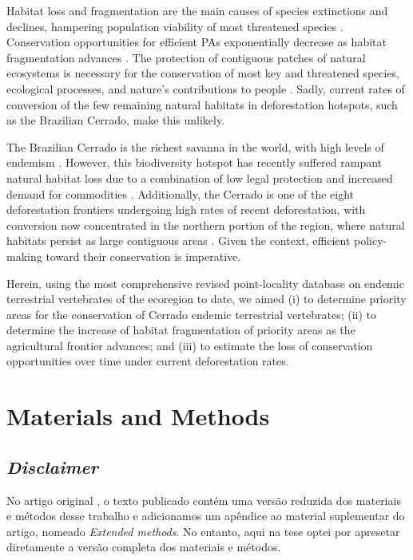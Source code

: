 \documentclass[12pt,openright,oneside,a4paper,english]{abntex2}
\begin{document}
Habitat loss and fragmentation are the main causes of species extinctions and declines, hampering population viability of most threatened species \citep{IPBES2019, Grande2020}. Conservation opportunities for efficient PAs exponentially decrease as habitat fragmentation advances \citep{Nori2013}. The protection of contiguous patches of natural ecosystems is necessary for the conservation of most key and threatened species, ecological processes, and nature’s contributions to people \citep{Diaz2018}. Sadly, current rates of conversion of the few remaining natural habitats in deforestation hotspots, such as the Brazilian Cerrado, make this unlikely.

The Brazilian Cerrado is the richest savanna in the world, with high levels of endemism \citep{Strassburg2017}. However, this biodiversity hotspot has recently suffered rampant natural habitat loss due to a combination of low legal protection and increased demand for commodities \citep{Pacheco2021}. Additionally, the Cerrado is one of the eight deforestation frontiers undergoing high rates of recent deforestation, with conversion now concentrated in the northern portion of the region, where natural habitats persist as large contiguous areas \citep{Strassburg2017}. Given the context, efficient policy-making toward their conservation is imperative.

Herein, using the most comprehensive revised point-locality database on endemic terrestrial vertebrates of the ecoregion to date, we aimed (i) to determine priority areas for the conservation of Cerrado endemic terrestrial vertebrates; (ii) to determine the increase of habitat fragmentation of priority areas as the agricultural frontier advances; and (iii) to estimate the loss of conservation opportunities over time under current deforestation rates.

\section{Materials and Methods}
\subsection*{\textit{Disclaimer}}

No artigo original \citep{VieiraAlencar2023}, o texto publicado contém uma versão reduzida dos materiais e métodos desse trabalho e adicionamos um apêndice ao material suplementar do artigo, nomeado \textit{Extended methods}. No entanto, aqui na tese optei por apresetar diretamente a versão completa dos materiais e métodos.
\end{document}
